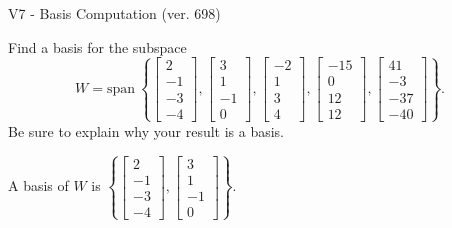 \begin{exercise}
  \begin{exerciseTitle}V7 - Basis Computation (ver. 698)\end{exerciseTitle}
  \begin{exerciseStatement}
    Find a basis for the subspace 
\[W=\mathrm{span}\ \left\{\left[\begin{array}{r}
2 \\
-1 \\
-3 \\
-4
\end{array}\right] , \left[\begin{array}{r}
3 \\
1 \\
-1 \\
0
\end{array}\right] , \left[\begin{array}{r}
-2 \\
1 \\
3 \\
4
\end{array}\right] , \left[\begin{array}{r}
-15 \\
0 \\
12 \\
12
\end{array}\right] , \left[\begin{array}{r}
41 \\
-3 \\
-37 \\
-40
\end{array}\right]\right\}.\]
 Be sure to explain why your result is a basis.


  \end{exerciseStatement}
  \begin{exerciseAnswer}
   A basis of \(W\) is  \(\left\{\left[\begin{array}{r}
2 \\
-1 \\
-3 \\
-4
\end{array}\right] , \left[\begin{array}{r}
3 \\
1 \\
-1 \\
0
\end{array}\right]\right\}\).
  


  \end{exerciseAnswer}
\end{exercise}